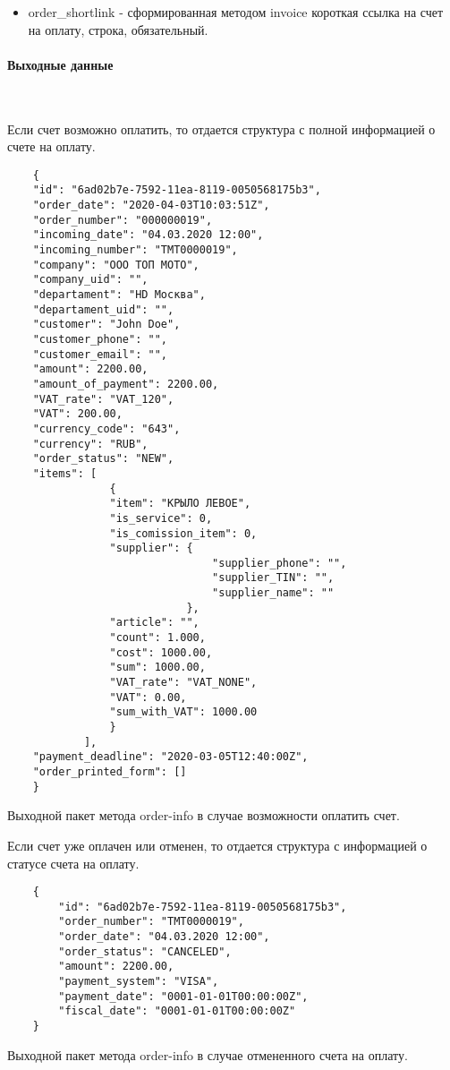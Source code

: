 \documentclass[11pt, a4paper]{article}
\begin{document}
\begin{itemize}
	\item order\_shortlink - сформированная методом invoice короткая ссылка на счет на оплату, строка, обязательный.
\end{itemize}

\paragraph{Выходные данные}\

Если счет возможно оплатить, то отдается структура с полной информацией о счете на оплату.

\begin{listing}[H]
	\begin{verbatim}
	{
	"id": "6ad02b7e-7592-11ea-8119-0050568175b3",
	"order_date": "2020-04-03T10:03:51Z",
	"order_number": "000000019",
	"incoming_date": "04.03.2020 12:00",
	"incoming_number": "ТМТ0000019",
	"company": "ООО ТОП МОТО",
	"company_uid": "",
	"departament": "HD Москва",
	"departament_uid": "",
	"customer": "John Doe",
	"customer_phone": "",
	"customer_email": "",
	"amount": 2200.00,
	"amount_of_payment": 2200.00,
	"VAT_rate": "VAT_120",
	"VAT": 200.00,
	"currency_сode": "643",
	"currency": "RUB",
	"order_status": "NEW",
	"items": [
				{
				"item": "КРЫЛО ЛЕВОЕ",
				"is_service": 0,
				"is_comission_item": 0,
				"supplier": {
								"supplier_phone": "",
								"supplier_TIN": "",
								"supplier_name": ""
							},
				"article": "",
				"count": 1.000,
				"cost": 1000.00,
				"sum": 1000.00,
				"VAT_rate": "VAT_NONE",
				"VAT": 0.00,
				"sum_with_VAT": 1000.00
				}
			],
	"payment_deadline": "2020-03-05T12:40:00Z",
	"order_printed_form": []
	}
	\end{verbatim}
	\caption{Выходной пакет метода order-info в случае возможности оплатить счет.} 
\end{listing}

Если счет уже оплачен или отменен, то отдается структура с информацией о статусе счета на оплату.

\begin{listing}[H]
	\begin{verbatim}
	{
		"id": "6ad02b7e-7592-11ea-8119-0050568175b3",
		"order_number": "ТМТ0000019",
		"order_date": "04.03.2020 12:00",
		"order_status": "CANCELED",
		"amount": 2200.00,
		"payment_system": "VISA",
		"payment_date": "0001-01-01T00:00:00Z",
		"fiscal_date": "0001-01-01T00:00:00Z"
	}
	\end{verbatim}
\caption{Выходной пакет метода order-info в случае отмененного счета на оплату.} 
\end{listing}
\end{document}
